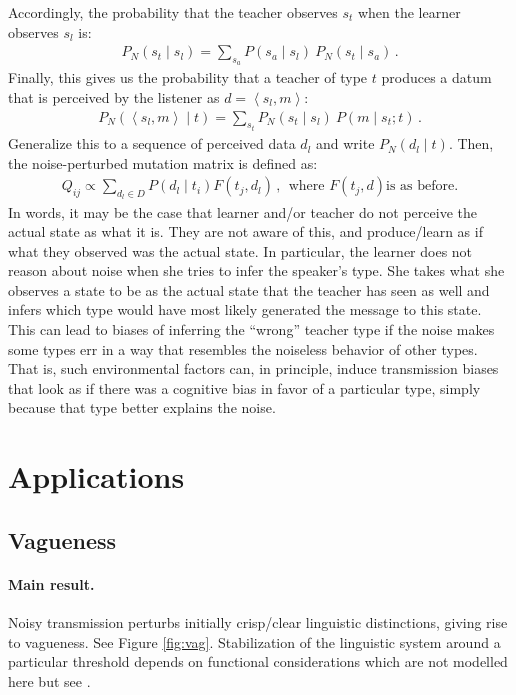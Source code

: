 \documentclass[10pt,a4paper]{article}
\newcommand{\tuple}[1]{\ensuremath{\left\langle #1 \right\rangle}}
\begin{document}
Accordingly, the probability that the teacher observes $s_t$ when the learner observes $s_l$ is:
\begin{align*}
  P_N(s_t \mid s_l) = \sum_{s_a} P(s_a \mid s_l) \ P_N(s_t \mid s_a)\,.
\end{align*}
Finally, this gives us the probability that a teacher of type $t$ produces a datum that is
perceived by the listener as $d = \tuple{s_l, m}$:
\begin{align*}
  P_N(\tuple{s_l, m} \mid t) = \sum_{s_t} P_N(s_t \mid s_l) \ P(m \mid s_t; t)\,.
\end{align*}
Generalize this to a sequence of perceived data $d_l$ and write $P_N(d_l \mid t)$. Then, the noise-perturbed mutation matrix is defined as:
\begin{align*}
  Q_{ij}  \propto \sum_{d_l \in D} P(d_l \mid t_i) F(t_j,d_l) \,, \ \  \text{where $F(t_j,d)$
    is as before.}
\end{align*}
In words, it may be the case that learner and/or teacher do not perceive the actual state as what it is. They are not aware of this, and produce/learn as if what they observed was the actual state. In particular, the learner does not reason about noise when she tries to infer the speaker's type. She takes what she observes a state to be as the actual state that the teacher has seen as well and infers which type would have most likely generated the message to this state. This can lead to biases of inferring the ``wrong'' teacher type if the noise makes some types err in a way that resembles the noiseless behavior of other types. That is, such environmental factors can, in principle, induce transmission biases that look as if there was a cognitive bias in favor of a particular type, simply because that type better explains the noise.

\section{Applications}
\subsection{Vagueness}
\paragraph{Main result.} Noisy transmission perturbs initially crisp/clear linguistic distinctions, giving rise to vagueness. See Figure \ref{fig:vag}. Stabilization of the linguistic system around a  particular threshold depends on functional considerations which are not modelled here but see \citealt{franke+correia:toappear}.
\end{document}
